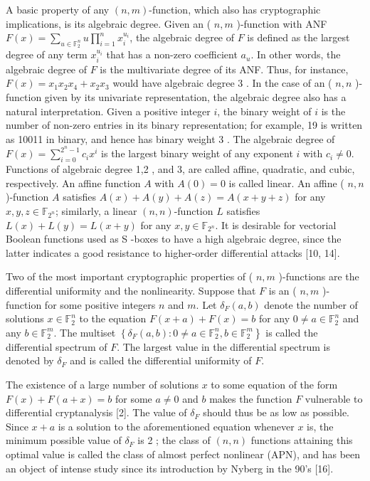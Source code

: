 \documentclass[10pt]{article}
\begin{document}
A basic property of any $(n, m)$-function, which also has cryptographic implications, is its algebraic degree. Given an ( $n, m$ )-function with ANF $F(x)=\sum_{u \in \mathbb{F}_{2}^{n}} u \prod_{i=1}^{n} x_{i}^{u_{i}}$, the algebraic degree of $F$ is defined as the largest degree of any term $x_{i}^{u_{i}}$ that has a non-zero coefficient $a_{u}$. In other words, the algebraic degree of $F$ is the multivariate degree of its ANF. Thus, for instance, $F(x)=x_{1} x_{2} x_{4}+x_{2} x_{3}$ would have algebraic degree 3 . In the case of an ( $n, n$ )-function given by its univariate representation, the algebraic degree also has a natural interpretation. Given a positive integer $i$, the binary weight of $i$ is the number of non-zero entries in its binary representation; for example, 19 is written as 10011 in binary, and hence has binary weight 3 . The algebraic degree of $F(x)=\sum_{i=0}^{2^{n}-1} c_{i} x^{i}$ is the largest binary weight of any exponent $i$ with $c_{i} \neq 0$. Functions of algebraic degree 1,2 , and 3, are called affine, quadratic, and cubic, respectively. An affine function $A$ with $A(0)=0$ is called linear. An affine ( $n, n$ )-function $A$ satisfies $A(x)+A(y)+A(z)=A(x+y+z)$ for any $x, y, z \in \mathbb{F}_{2^{n}}$; similarly, a linear $(n, n)$-function $L$ satisfies $L(x)+L(y)=L(x+y)$ for any $x, y \in \mathbb{F}_{2^{n}}$. It is desirable for vectorial Boolean functions used as S -boxes to have a high algebraic degree, since the latter indicates a good resistance to higher-order differential attacks [10, 14].

Two of the most important cryptographic properties of ( $n, m$ )-functions are the differential uniformity and the nonlinearity. Suppose that $F$ is an ( $n, m$ )-function for some positive integers $n$ and $m$. Let $\delta_{F}(a, b)$ denote the number of solutions $x \in \mathbb{F}_{2}^{n}$ to the equation $F(x+a)+F(x)=b$ for any $0 \neq a \in \mathbb{F}_{2}^{n}$ and any $b \in \mathbb{F}_{2}^{m}$. The multiset $\left\{\delta_{F}(a, b): 0 \neq\right. \left.a \in \mathbb{F}_{2}^{n}, b \in \mathbb{F}_{2}^{m}\right\}$ is called the differential spectrum of $F$. The largest value in the differential spectrum is denoted by $\delta_{F}$ and is called the differential uniformity of $F$.

The existence of a large number of solutions $x$ to some equation of the form $F(x)+F(a+ x)=b$ for some $a \neq 0$ and $b$ makes the function $F$ vulnerable to differential cryptanalysis [2]. The value of $\delta_{F}$ should thus be as low as possible. Since $x+a$ is a solution to the aforementioned equation whenever $x$ is, the minimum possible value of $\delta_{F}$ is 2 ; the class of $(n, n)$ functions attaining this optimal value is called the class of almost perfect nonlinear (APN), and has been an object of intense study since its introduction by Nyberg in the 90's [16].
\end{document}
